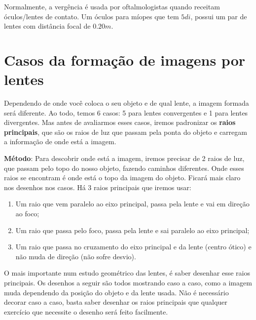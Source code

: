 \documentclass[12pt]{extarticle}
\newcommand{\<}{\langle}
\renewcommand{\>}{\rangle}
\theoremstyle{definition}
\begin{document}
Normalmente, a vergência é usada por oftalmologistas quando receitam óculos/lentes de contato. Um óculos para míopes que tem $5 di$, possui um par de lentes com distância focal de $0.20 m$.

\section{Casos da formação de imagens por lentes}

Dependendo de onde você coloca o seu objeto e de qual lente, a imagem formada será diferente. Ao todo, temos 6 casos: 5 para lentes convergentes e 1 para lentes divergentes. Mas antes de avaliarmos esses casos, iremos padronizar os \textbf{raios principais}, que são os raios de luz que passam pela ponta do objeto e carregam a
informação de onde está a imagem.

\textbf{Método}: Para descobrir onde está a imagem, iremos precisar de 2 raios de luz, que passam pelo topo do nosso objeto, fazendo caminhos diferentes. Onde esses raios se encontram é onde está o topo da imagem do objeto. Ficará mais claro nos desenhos
nos casos. Há 3 raios principais que iremos usar:

\begin{enumerate}
    \item 
    Um raio que vem paralelo ao eixo principal, passa pela lente e vai em direção ao foco;
    \item
    Um raio que passa pelo foco, passa pela lente e sai paralelo ao eixo principal;
    \item
    Um raio que passa no cruzamento do eixo principal e da lente (centro ótico) e não muda de direção (não sofre desvio).
\end{enumerate}

O mais importante num estudo geométrico das lentes, é saber desenhar esse raios principais. Os desenhos a seguir são todos mostrando caso a caso, como a imagem muda dependendo da posição do objeto e da lente usada. Não é necessário decorar caso a caso, basta saber desenhar os raios principais que qualquer exercício que necessite o desenho será feito facilmente.
\end{document}
